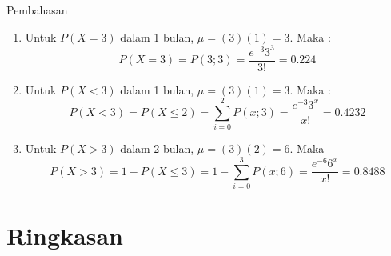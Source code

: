 \documentclass[]{beamer}
\begin{document}
\begin{frame}
    \begin{exampleblock}{Pembahasan}
        \begin{enumerate}
            \item Untuk $P(X=3)$ dalam 1 bulan, $\mu = (3)(1) = 3$. Maka :
            \begin{equation*}
                P(X=3)= P(3;3)=\frac{e^{-3}3^3}{3!} = 0.224
            \end{equation*}
            \item Untuk $P(X<3)$ dalam 1 bulan, $\mu = (3)(1) = 3$. Maka :
            \begin{equation*}
                P(X<3)= P(X\le 2) = \sum_{i=0}^2 P(x;3)=\frac{e^{-3}3^x}{x!} = 0.4232
            \end{equation*}
            \item Untuk $P(X>3)$ dalam 2 bulan, $\mu = (3)(2) = 6$. Maka
            \begin{equation*}
                P(X>3)= 1-P(X\le 3) = 1-\sum_{i=0}^3 P(x;6)=\frac{e^{-6}6^x}{x!} = 0.8488
            \end{equation*}
        \end{enumerate}
    \end{exampleblock}
\end{frame}
\section{Ringkasan}
\end{document}
